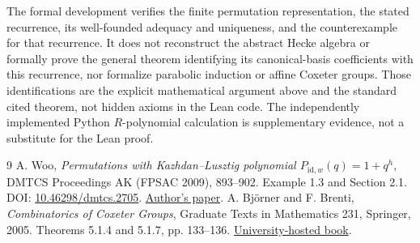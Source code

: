 \documentclass[11pt]{article}
\begin{document}
The formal development verifies the finite permutation representation, the stated recurrence, its well-founded adequacy and uniqueness, and the counterexample for that recurrence. It does not reconstruct the abstract Hecke algebra or formally prove the general theorem identifying its canonical-basis coefficients with this recurrence, nor formalize parabolic induction or affine Coxeter groups. Those identifications are the explicit mathematical argument above and the standard cited theorem, not hidden axioms in the Lean code. The independently implemented Python $R$-polynomial calculation is supplementary evidence, not a substitute for the Lean proof.

\begin{thebibliography}{9}
 A. Woo, \emph{Permutations with Kazhdan--Lusztig polynomial $P_{\mathrm{id},w}(q)=1+q^h$}, DMTCS Proceedings AK (FPSAC 2009), 893--902. Example 1.3 and Section 2.1. DOI: \href{https://doi.org/10.46298/dmtcs.2705}{10.46298/dmtcs.2705}. \href{https://dmtcs.episciences.org/en/articles/2705/download}{Author's paper}.
 A. Bj\"orner and F. Brenti, \emph{Combinatorics of Coxeter Groups}, Graduate Texts in Mathematics 231, Springer, 2005. Theorems 5.1.4 and 5.1.7, pp. 133--136. \href{https://sites.math.washington.edu/~billey/classes/reflection.groups/references/EntireBook.pdf}{University-hosted book}.
\end{thebibliography}
\end{document}
